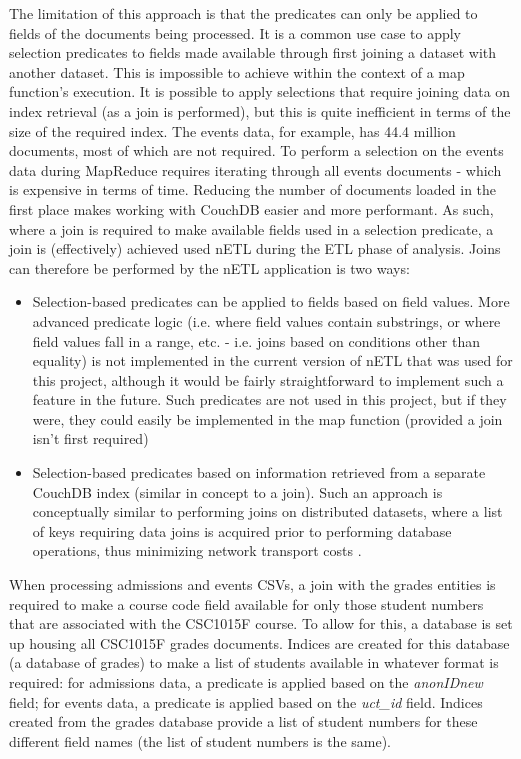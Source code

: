 The limitation of this approach is that the predicates can only be applied to fields of the documents being processed. It is a common use case to apply selection predicates to fields made available through first joining a dataset with another dataset. This is impossible to achieve within the context of a map function’s execution. It is possible to apply selections that require joining data on index retrieval (as a join is performed), but this is quite inefficient in terms of the size of the required index. The events data, for example, has 44.4 million documents, most of which are not required. To perform a selection on the events data during MapReduce requires iterating through all events documents - which is expensive in terms of time. Reducing the number of documents loaded in the first place makes working with CouchDB easier and more performant. As such, where a join is required to make available fields used in a selection predicate, a join is (effectively) achieved used nETL during the ETL phase of analysis. Joins can therefore be performed by the nETL application is two ways:

\begin{itemize}
  \item Selection-based predicates can be applied to fields based on field values. More advanced predicate logic (i.e. where field values contain substrings, or where field values fall in a range, etc. - i.e. joins based on conditions other than equality) is not implemented in the current version of nETL that was used for this project, although it would be fairly straightforward to implement such a feature in the future. Such predicates are not used in this project, but if they were, they could easily be implemented in the map function (provided a join isn't first required)
  \item Selection-based predicates based on information retrieved from a separate CouchDB index (similar in concept to a join). Such an approach is conceptually similar to performing joins on distributed datasets, where a list of keys requiring data joins is acquired prior to performing database operations, thus minimizing network transport costs \cite{sonia2018}.
\end{itemize}

When processing admissions and events CSVs, a join with the grades entities is required to make a course code field available for only those student numbers that are associated with the CSC1015F course. To allow for this, a database is set up housing all CSC1015F grades documents. Indices are created for this database (a database of grades) to make a list of students available in whatever format is required: for admissions data, a predicate is applied based on the \textit{anonIDnew} field; for events data, a predicate is applied based on the \textit{uct\_id} field. Indices created from the grades database provide a list of student numbers for these different field names (the list of student numbers is the same).

